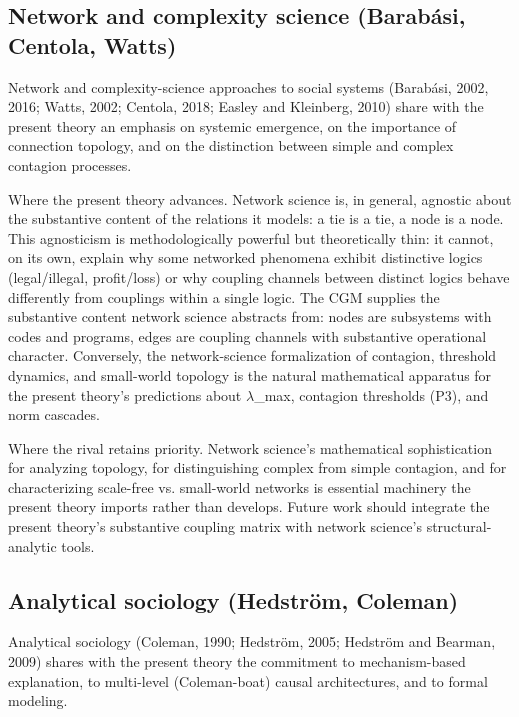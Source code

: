\documentclass[12pt,a4paper]{article}
\begin{document}
\subsection{Network and complexity science (Barabási, Centola, Watts)}

Network and complexity-science approaches to social systems (Barabási, 2002, 2016; Watts, 2002; Centola, 2018; Easley and Kleinberg, 2010) share with the present theory an emphasis on systemic emergence, on the importance of connection topology, and on the distinction between simple and complex contagion processes.


Where the present theory advances. Network science is, in general, agnostic about the substantive content of the relations it models: a tie is a tie, a node is a node. This agnosticism is methodologically powerful but theoretically thin: it cannot, on its own, explain why some networked phenomena exhibit distinctive logics (legal/illegal, profit/loss) or why coupling channels between distinct logics behave differently from couplings within a single logic. The CGM supplies the substantive content network science abstracts from: nodes are subsystems with codes and programs, edges are coupling channels with substantive operational character. Conversely, the network-science formalization of contagion, threshold dynamics, and small-world topology is the natural mathematical apparatus for the present theory's predictions about $\lambda$_max, contagion thresholds (P3), and norm cascades.


Where the rival retains priority. Network science's mathematical sophistication for analyzing topology, for distinguishing complex from simple contagion, and for characterizing scale-free vs. small-world networks is essential machinery the present theory imports rather than develops. Future work should integrate the present theory's substantive coupling matrix with network science's structural-analytic tools.

\subsection{Analytical sociology (Hedström, Coleman)}

Analytical sociology (Coleman, 1990; Hedström, 2005; Hedström and Bearman, 2009) shares with the present theory the commitment to mechanism-based explanation, to multi-level (Coleman-boat) causal architectures, and to formal modeling.
\end{document}
